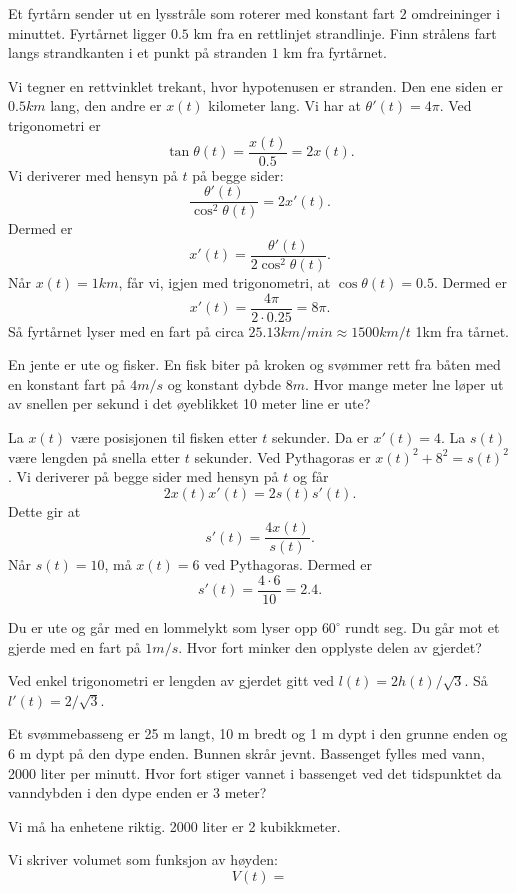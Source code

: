 \documentclass[11pt, norsk]{article}
\begin{document}
\begin{oppg}[7.3]
Et fyrtårn sender ut en lysstråle som roterer med konstant fart $2$ omdreininger i minuttet. Fyrtårnet ligger $0.5$ km fra en rettlinjet strandlinje. Finn strålens fart langs strandkanten i et punkt på stranden $1$ km fra fyrtårnet.
\end{oppg}

\begin{losn}
Vi tegner en rettvinklet trekant, hvor hypotenusen er stranden. Den ene siden er $0.5 km$ lang, den andre er $x(t)$ kilometer lang. Vi har at $\theta'(t)=4 \pi$. Ved trigonometri er
$$
\tan \theta(t) = \frac{x(t)}{0.5} = 2x(t).
$$
Vi deriverer med hensyn på $t$ på begge sider:
$$
\frac{\theta'(t)}{\cos^2 \theta(t)} = 2 x'(t).
$$
Dermed er 
$$
x'(t) = \frac{\theta'(t)}{2 \cos^2 \theta(t)}.
$$
Når $x(t)=1 km$, får vi, igjen med trigonometri, at $\cos \theta(t)=0.5$. Dermed er 
$$
x'(t) = \frac{4 \pi}{2 \cdot 0.25} = 8 \pi.
$$
Så fyrtårnet lyser med en fart på circa $25.13 km/min \approx 1500 km/t$ 1km fra tårnet.
\end{losn}

\begin{oppg}[7.5]
En jente er ute og fisker. En fisk biter på kroken og svømmer rett fra båten med en konstant fart på $4 m/s$ og konstant dybde $8 m$. Hvor mange meter lne løper ut av snellen per sekund i det øyeblikket 10 meter line er ute?
\end{oppg}

\begin{losn}
La $x(t)$ være posisjonen til fisken etter $t$ sekunder. Da er $x'(t)=4$. La $s(t)$ være lengden på snella etter $t$ sekunder. Ved Pythagoras er $x(t)^2 +8^2 = s(t)^2$. Vi deriverer på begge sider med hensyn på $t$ og får
$$
2x(t)x'(t) = 2s(t) s'(t).
$$
Dette gir at
$$
s'(t) = \frac{4x(t)}{s(t)}.
$$
Når $s(t)=10$, må $x(t)=6$ ved Pythagoras. Dermed er 
$$
s'(t) = \frac{4 \cdot 6}{10} = 2.4.
$$
\end{losn}

\begin{oppg}[7.7]
Du er ute og går med en lommelykt som lyser opp $60^\circ$ rundt seg. Du går mot et gjerde med en fart på $1 m/s$. Hvor fort minker den opplyste delen av gjerdet?
\end{oppg}

\begin{losn}
Ved enkel trigonometri er lengden av gjerdet gitt ved $l(t) = 2h(t)/\sqrt{3}$. Så $l'(t)= 2/\sqrt{3}$.
\end{losn}

\begin{oppg}
Et svømmebasseng er 25 m langt, 10 m bredt og 1 m dypt i den grunne enden og 6 m dypt på den dype enden. Bunnen skrår jevnt. Bassenget fylles med vann, 2000 liter per minutt. Hvor fort stiger vannet i bassenget ved det tidspunktet da vanndybden i den dype enden er 3 meter?
\end{oppg}

\begin{losn}
Vi må ha enhetene riktig. 2000 liter er 2 kubikkmeter. 

Vi skriver volumet som funksjon av høyden:
$$
V(t) = 
$$
\end{losn}
\end{document}
